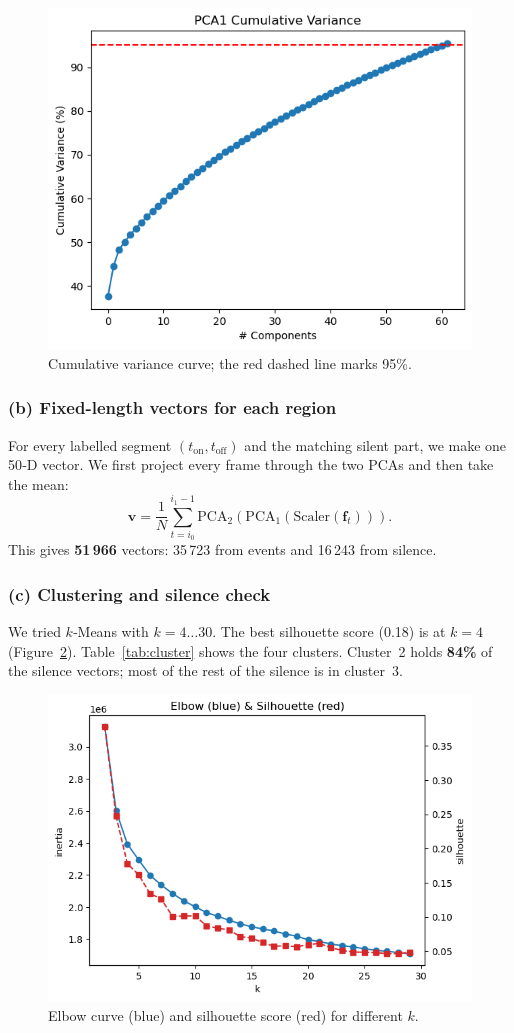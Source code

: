 \documentclass[runningheads]{llncs}
\begin{document}
\begin{figure}[h]
    \centering
    \includegraphics[width=.55\linewidth]{figs_tang/03_pca_cumulative_variance.png}
    \caption{Cumulative variance curve; the red dashed line marks 95\%.}
    \label{fig:pca}
\end{figure}

\subsubsection{(b) Fixed-length vectors for each region}
For every labelled segment $(t_\text{on}, t_\text{off})$ and the matching silent part, we make one 50‑D vector. We first project every frame through the two PCAs and then take the mean:
\[
\mathbf v = \frac{1}{N}\sum_{t=i_0}^{i_1-1}
\mathrm{PCA}_2(\mathrm{PCA}_1(\mathrm{Scaler}(\mathbf f_t))).
\]
This gives \textbf{51\,966} vectors: 35\,723 from events and 16\,243 from silence.

\subsubsection{(c) Clustering and silence check}
We tried $k$‑Means with $k=4\ldots30$. The best silhouette score (0.18) is at $k=4$ (Figure~\ref{fig:elbow}). Table~\ref{tab:cluster} shows the four clusters. Cluster~2 holds \textbf{84\%} of the silence vectors; most of the rest of the silence is in cluster~3.

\begin{figure}[h]
    \centering
    \includegraphics[width=.55\linewidth]{figs_tang/03_elbow_silhouette.png}
    \caption{Elbow curve (blue) and silhouette score (red) for different $k$.}
    \label{fig:elbow}
\end{figure}
\end{document}
